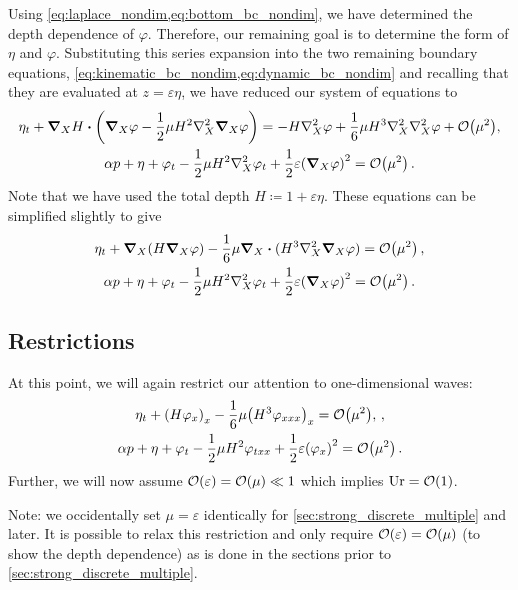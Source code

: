 \documentclass{jfm}
\let\Oldsubsection\subsection
\renewcommand{\subsection}{\FloatBarrier\Oldsubsection}
\DeclareMathOperator{\Ur}{Ur}
\renewcommand*{\epsilon}{\varepsilon}
\begin{document}
Using \cref{eq:laplace_nondim,eq:bottom_bc_nondim}, we have determined
the depth dependence of $\varphi$.
Therefore, our remaining goal is to determine the form of $\eta$ and
$\varphi$.
Substituting this series expansion into the two
remaining boundary equations,
\cref{eq:kinematic_bc_nondim,eq:dynamic_bc_nondim} and recalling that
they are evaluated at $z=\epsilon \eta$, we have reduced our system of
equations to
\begin{gather}
  \eta_t + \grad_X{H}\vdot\pqty{\grad_X\varphi
    -\frac{1}{2}\mu H^2\laplacian_X\grad_X\varphi} =
    -H\laplacian_X\varphi
  +\frac{1}{6}\mu H^3\laplacian_X\laplacian_X\varphi +
    \order{\mu^2}, \\
  \alpha p + \eta + \varphi_{t} - \frac{1}{2}\mu
    H^2\laplacian_X\varphi_{t} + \frac{1}{2}\epsilon
    \pqty{\grad_X\varphi}^2 = \order{\mu^2} \,.
\end{gather}
Note that we have used the total depth $H\coloneqq 1+\epsilon\eta$.
These equations can be simplified slightly to give
\begin{gather}
  \eta_t + \grad_X(H\grad_X\varphi)
    -\frac{1}{6}\mu \grad_X\vdot(H^3\laplacian_X\grad_X\varphi) =
    \order{\mu^2} \,, \\
  \alpha p + \eta + \varphi_{t} - \frac{1}{2}\mu
    H^2\laplacian_X\varphi_{t} +
    \frac{1}{2}\epsilon\pqty{\grad_X\varphi}^2 = \order{\mu^2} \,.
\end{gather}

\subsection{Restrictions}
At this point, we will again restrict our attention to one-dimensional
waves:
\begin{gather}
  \eta_t + \pqty{H\varphi_x}_x
    -\frac{1}{6}\mu \pqty{H^3\varphi_{xxx}}_x =
    \order{\mu^2}, \label{eq:kinematic_bc_varphi} \,, \\
  \alpha p +\eta + \varphi_t - \frac{1}{2}\mu H^2\varphi_{txx} +
    \frac{1}{2}\epsilon\pqty{\varphi_x}^2 = \order{\mu^2} \,.
  \label{eq:dynamic_bc_varphi}
\end{gather}
Further, we will now assume $\order{\epsilon} = \order{\mu} \ll 1$ which
implies $\Ur = \order{1}$.

Note: we occidentally set $\mu=\epsilon$ identically for
\cref{sec:strong_discrete_multiple} and later.
It is possible to relax this restriction and only require
$\order{\epsilon} = \order{\mu}$ (to show the depth dependence) as is
done in the sections prior to \cref{sec:strong_discrete_multiple}.
\end{document}
